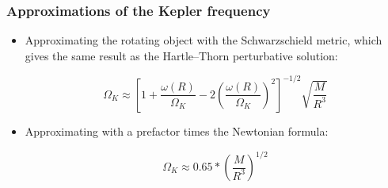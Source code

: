\begin{frame}
\frametitle{Approximations of the Kepler frequency}

\begin{itemize}
	\item Approximating the rotating object with the Schwarzschield metric, which gives the same result as the Hartle--Thorn perturbative solution:
	\begin{block}{}
		\begin{equation} \label{eq:5}
			\Omega_{K}
			\approx
			\left[
				1
				+
				\frac{\omega \left( R \right)}{\Omega_{K}}
				-
				2 \left(
					\frac{\omega \left( R \right)}{\Omega_{K}}
				\right)^{2}
			\right]^{-1/2}
			\sqrt{\frac{M}{R^{3}}}
		\end{equation}
	\end{block}
	\item Approximating with a prefactor times the Newtonian formula:
	\begin{block}{}
		\begin{equation} \label{eq:6}
			\Omega_{K}
			\approx
			0.65 * \left( \frac{M}{R^{3}} \right)^{1/2}
		\end{equation}
	\end{block}
\end{itemize}

\end{frame}
